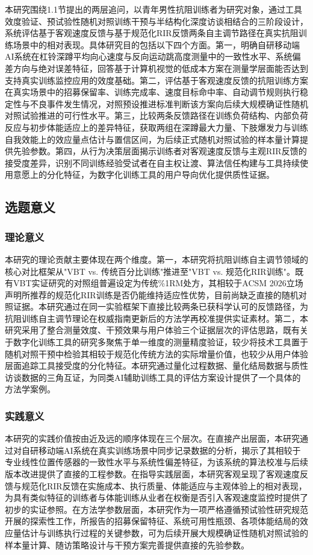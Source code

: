 本研究围绕1.1节提出的两层追问，以青年男性抗阻训练者为研究对象，通过工具效度验证、预试验性随机对照训练干预与半结构化深度访谈相结合的三阶段设计，系统评估基于客观速度反馈与基于规范化RIR反馈两条自主调节路径在真实抗阻训练场景中的相对表现。具体研究目的包括以下四个方面。第一，明确自研移动端AI系统在杠铃深蹲平均向心速度与反向运动跳高度测量中的一致性水平、系统偏差方向与绝对误差特征，回答基于计算机视觉的低成本方案在测量学层面能否达到支持真实训练监控应用的效度基础。第二，评估基于客观速度反馈的抗阻训练方案在真实场景中的招募保留率、训练完成率、速度目标命中率、自动调节规则执行稳定性与不良事件发生情况，对照预设推进标准判断该方案向后续大规模确证性随机对照试验推进的可行性水平。第三，比较两条反馈路径在训练负荷结构、内部负荷反应与初步体能适应上的差异特征，获取两组在深蹲最大力量、下肢爆发力与训练自我效能上的效应量点估计与置信区间，为后续正式随机对照试验的样本量计算提供先验参数。第四，从行为决策层面揭示训练者对客观速度反馈与主观RIR反馈的接受度差异，识别不同训练经验受试者在自主权让渡、算法信任构建与工具持续使用意愿上的分化特征，为数字化训练工具的用户导向优化提供质性证据。

\subsection{选题意义}

\subsubsection{理论意义}

本研究的理论贡献主要体现在两个维度。第一，本研究将抗阻训练自主调节领域的核心对比框架从"VBT vs. 传统百分比训练"推进至"VBT vs. 规范化RIR训练"。既有VBT实证研究的对照组普遍设定为传统\%1RM处方，其相较于ACSM 2026立场声明所推荐的规范化RIR训练是否仍能维持适应性优势，目前尚缺乏直接的随机对照证据。本研究通过在同一实验框架下直接比较两条已获科学认可的反馈路径，为抗阻训练自主调节理论在权威指南更新后的方法学再校准提供实证素材。第二，本研究采用了整合测量效度、干预效果与用户体验三个证据层次的评估思路，既有关于数字化训练工具的研究多聚焦于单一维度的测量精度验证，较少将技术工具置于随机对照干预中检验其相较于规范化传统方法的实际增量价值，也较少从用户体验层面追踪工具接受度的分化特征。本研究通过量化过程数据、量化结局数据与质性访谈数据的三角互证，为同类AI辅助训练工具的评估方案设计提供了一个具体的方法学案例。

\subsubsection{实践意义}

本研究的实践价值按由近及远的顺序体现在三个层次。在直接产出层面，本研究通过对自研移动端AI系统在真实训练场景中同步记录数据的分析，揭示了其相较于专业线性位置传感器的一致性水平与系统性偏差特征，为该系统的算法校准与后续版本改进提供了直接的工程参数。在指导实践层面，本研究客观呈现了客观速度反馈与规范化RIR反馈在实施成本、执行质量、体能适应与主观体验上的相对表现，为具有类似特征的训练者与体能训练从业者在权衡是否引入客观速度监控时提供了初步的实证参照。在方法学参数层面，本研究作为一项严格遵循预试验性研究规范开展的探索性工作，所报告的招募保留特征、系统可用性瓶颈、各项体能结局的效应量估计与训练执行过程的关键参数，可为后续开展大规模确证性随机对照试验的样本量计算、随访策略设计与干预方案完善提供直接的先验参数。
